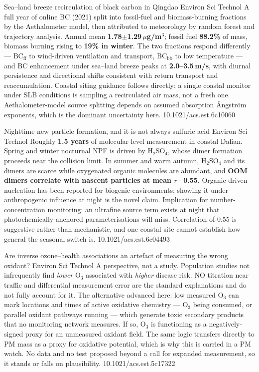 \documentclass[10pt]{article}
\begin{document}
{Sea--land breeze recirculation of black carbon in Qingdao}
{Environ Sci Technol}
{A full year of online BC (2021) split into fossil-fuel and biomass-burning fractions by
the Aethalometer model, then attributed to meteorology by random forest and trajectory
analysis. Annual mean \textbf{1.78$\pm$1.29\,$\mu$g/m$^3$}; fossil fuel \textbf{88.2\%} of
mass, biomass burning rising to \textbf{19\% in winter}. The two fractions respond
differently --- BC$_\mathrm{ff}$ to wind-driven ventilation and transport, BC$_\mathrm{bb}$
to low temperature --- and BC enhancement under sea--land breeze peaks at
\textbf{2.0--3.5\,m/s}, with diurnal persistence and directional shifts consistent with
return transport and reaccumulation. Coastal siting guidance follows directly: a single
coastal monitor under SLB conditions is sampling a recirculated air mass, not a fresh one.
Aethalometer-model source splitting depends on assumed absorption {\AA}ngstr\"om
exponents, which is the dominant uncertainty here.}
{10.1021/acs.est.6c10060}

{Nighttime new particle formation, and it is not always sulfuric acid}
{Environ Sci Technol}
{Roughly \textbf{1.5 years} of molecular-level measurement in coastal Dalian. Spring and
winter nocturnal NPF is driven by H$_2$SO$_4$, whose dimer formation proceeds near the
collision limit. In summer and warm autumn, H$_2$SO$_4$ and its dimers are scarce while
oxygenated organic molecules are abundant, and \textbf{OOM dimers correlate with nascent
particles at mean $r$=0.55}. Organic-driven nucleation has been reported for biogenic
environments; showing it under anthropogenic influence at night is the novel claim.
Implication for number-concentration monitoring: an ultrafine source term exists at night
that photochemically-anchored parameterisations will miss. Correlation of 0.55 is
suggestive rather than mechanistic, and one coastal site cannot establish how general the
seasonal switch is.}
{10.1021/acs.est.6c04493}

{Are inverse ozone--health associations an artefact of measuring the wrong oxidant?}
{Environ Sci Technol}
{A perspective, not a study. Population studies not infrequently find \emph{lower} O$_3$
associated with \emph{higher} disease risk. NO titration near traffic and differential
measurement error are the standard explanations and do not fully account for it. The
alternative advanced here: low measured O$_3$ can mark locations and times of active
oxidative chemistry --- O$_3$ being consumed, or parallel oxidant pathways running ---
which generate toxic secondary products that no monitoring network measures. If so, O$_3$
is functioning as a negatively-signed proxy for an unmeasured oxidant field. The same
logic transfers directly to PM mass as a proxy for oxidative potential, which is why this
is carried in a PM watch. No data and no test proposed beyond a call for expanded
measurement, so it stands or falls on plausibility.}
{10.1021/acs.est.5c17322}
\end{document}
